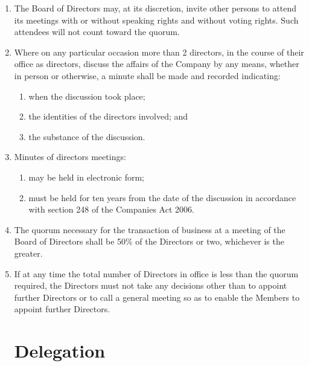 \begin{enumerate}
\item The Board of Directors may, at its discretion, invite other persons to
  attend its meetings with or without speaking rights and without voting
  rights. Such attendees will not count toward the quorum.

\item
    Where on any particular occasion more than 2 directors, in the course of their
    office as directors, discuss the affairs of the Company by any means, whether in person
    or otherwise, a minute shall be made and recorded indicating:
        \begin{enumerate}
            \item
                when the discussion took place;
            \item
                the identities of the directors involved; and
            \item
                the substance of the discussion.
        \end{enumerate}
\item
    Minutes of directors meetings:
        \begin{enumerate}
            \item
                may be held in electronic form;
            \item
                must be held for ten years from the date of the discussion in accordance with section
                248 of the Companies Act 2006.
        \end{enumerate}
\item The quorum necessary for the transaction of business at a meeting of the
      Board of Directors shall be 50\% of the Directors or two, whichever is the greater.
\item If at any time the total number of Directors in office is less than the quorum required,
      the Directors must not take any decisions other than to appoint further Directors or to call
      a general meeting so as to enable the Members to appoint further Directors.

\section{Delegation}


\end{enumerate}
